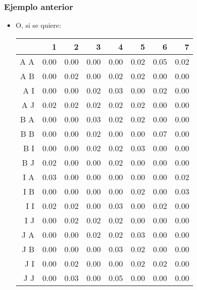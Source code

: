 \begin{frame}
\frametitle{Ejemplo anterior}
\begin{itemize}
\item<2->{O, si se quiere:
{\tiny\begin{table}[ht]
\begin{center}
\begin{tabular}{rrrrrrrr}
  \hline
 & 1 & 2 & 3 & 4 & 5 & 6 & 7 \\
  \hline
A A & 0.00 & 0.00 & 0.00 & 0.00 & 0.02 & 0.05 & 0.02 \\
  A B & 0.00 & 0.02 & 0.00 & 0.02 & 0.02 & 0.00 & 0.00 \\
  A I & 0.00 & 0.00 & 0.02 & 0.03 & 0.00 & 0.02 & 0.00 \\
  A J & 0.02 & 0.02 & 0.02 & 0.02 & 0.02 & 0.00 & 0.00 \\
  B A & 0.00 & 0.00 & 0.03 & 0.02 & 0.02 & 0.00 & 0.00 \\
  B B & 0.00 & 0.00 & 0.02 & 0.00 & 0.00 & 0.07 & 0.00 \\
  B I & 0.00 & 0.00 & 0.02 & 0.02 & 0.03 & 0.00 & 0.00 \\
  B J & 0.02 & 0.00 & 0.00 & 0.02 & 0.00 & 0.00 & 0.00 \\
  I A & 0.03 & 0.00 & 0.00 & 0.00 & 0.00 & 0.00 & 0.02 \\
  I B & 0.00 & 0.00 & 0.00 & 0.00 & 0.02 & 0.00 & 0.03 \\
  I I & 0.02 & 0.02 & 0.00 & 0.03 & 0.00 & 0.02 & 0.00 \\
  I J & 0.00 & 0.02 & 0.02 & 0.02 & 0.00 & 0.00 & 0.00 \\
  J A & 0.00 & 0.00 & 0.02 & 0.02 & 0.03 & 0.00 & 0.00 \\
  J B & 0.00 & 0.00 & 0.00 & 0.03 & 0.02 & 0.00 & 0.00 \\
  J I & 0.00 & 0.02 & 0.00 & 0.00 & 0.02 & 0.02 & 0.00 \\
  J J & 0.00 & 0.03 & 0.00 & 0.05 & 0.00 & 0.00 & 0.00 \\
   \hline
\end{tabular}
\end{center}
\end{table}
}}
\end{itemize}
\end{frame}

